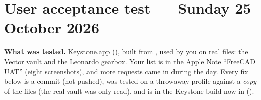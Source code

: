\section{User acceptance test --- Sunday 25 October 2026}\label{sec:uat}

\textbf{What was tested.} Keystone.app (), built from , used by you on
real files: the Vector vault and the Leonardo gearbox. Your list is in the Apple Note ``FreeCAD UAT'' (eight
screenshots), and more requests came in during the day. Every fix below is a \code{[BW]} commit (not pushed),
was tested on a throwaway profile against a \emph{copy} of the files (the real vault was only read), and
is in the Keystone build now in  ().


